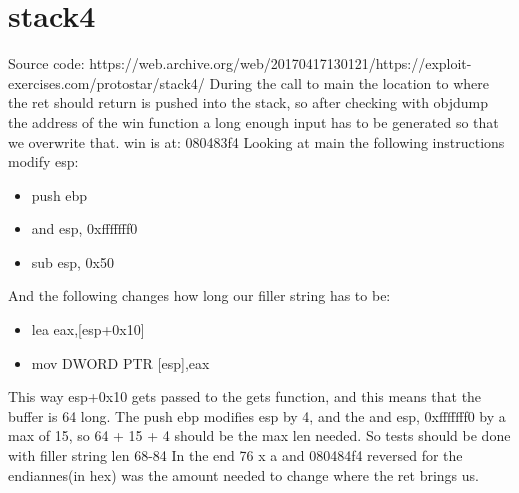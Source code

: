 \documentclass[11pt,a4paper]{article}
\begin{document}
\section*{stack4}
\markright{}
Source code:\newline
https://web.archive.org/web/20170417130121/https://exploit-exercises.com/protostar/stack4/\newline
During the call to main the location to where the ret should return is pushed into the stack, so after checking with objdump the address of the win function a long enough input has to be generated so that we overwrite that.\newline
win is at: 080483f4\newline
Looking at main the following instructions modify esp:\newline
\begin{itemize}
\item push ebp
\item and esp, 0xfffffff0
\item sub esp, 0x50
\end{itemize}
And the following changes how long our filler string has to be:
\begin{itemize}
\item lea eax,[esp+0x10]
\item mov DWORD PTR [esp],eax
\end{itemize}
This way esp+0x10 gets passed to the gets function, and this means that the buffer is 64 long.\newline
The push ebp modifies esp by 4, and the and esp, 0xfffffff0 by a max of 15, so 64 + 15 + 4 should be the max len needed.\newline
So tests should be done with filler string len 68-84\newline
In the end 76 x a and 080484f4 reversed for the endiannes(in hex) was the amount needed to change where the ret brings us.
\end{document}
